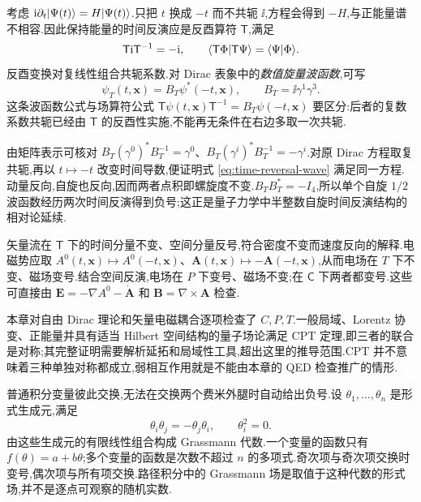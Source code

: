 考虑 $\mathrm i\partial_t\lvert \Psi(t)\rangle=H\lvert \Psi(t)\rangle$.只把 $t$ 换成 $-t$ 而不共轭 $\ii$,方程会得到 $-H$,与正能量谱不相容.因此保持能量的时间反演应是反酉算符 $\mathsf T$,满足
\begin{equation}
 \mathsf T\mathrm i\mathsf T^{-1}=-\mathrm i,
 \qquad\langle \mathsf T\Phi\vert \mathsf T\Psi\rangle=\langle \Psi\vert \Phi\rangle.
\end{equation}
反酉变换对复线性组合共轭系数.对 Dirac 表象中的\emph{数值旋量波函数},可写
\begin{equation}
 \psi_T(t,\mathbf x)=B_T\psi^*(-t,\mathbf x),
 \qquad B_T=\ii\gamma^1\gamma^3.
 \label{eq:time-reversal-wave}
\end{equation}
这条波函数公式与场算符公式 $\mathsf T\psi(t,\mathbf x)\mathsf T^{-1}=B_T\psi(-t,\mathbf x)$ 要区分:后者的复数系数共轭已经由 $\mathsf T$ 的反酉性实施,不能再无条件在右边多取一次共轭.

由矩阵表示可核对 $B_T(\gamma^0)^*B_T^{-1}=\gamma^0$、$B_T(\gamma^i)^*B_T^{-1}=-\gamma^i$.对原 Dirac 方程取复共轭,再以 $t\mapsto-t$ 改变时间导数,便证明式 \eqref{eq:time-reversal-wave} 满足同一方程.动量反向,自旋也反向,因而两者点积即螺旋度不变.$B_TB_T^*=-I_4$,所以单个自旋 $1/2$ 波函数经历两次时间反演得到负号;这正是量子力学中半整数自旋时间反演结构的相对论延续.

矢量流在 $\mathsf T$ 下的时间分量不变、空间分量反号,符合密度不变而速度反向的解释.电磁势应取 $A^0(t,\mathbf x)\mapsto A^0(-t,\mathbf x)$、$\mathbf A(t,\mathbf x)\mapsto-\mathbf A(-t,\mathbf x)$,从而电场在 $T$ 下不变、磁场变号.结合空间反演,电场在 $P$ 下变号、磁场不变;在 $\mathsf C$ 下两者都变号.这些可直接由 $\mathbf E=-\nabla A^0-\dot{\mathbf A}$ 和 $\mathbf B=\nabla\times\mathbf A$ 检查.

\begin{remark}
本章对自由 Dirac 理论和矢量电磁耦合逐项检查了 $C,P,T$.一般局域、Lorentz 协变、正能量并具有适当 Hilbert 空间结构的量子场论满足 CPT 定理,即三者的联合是对称;其完整证明需要解析延拓和局域性工具,超出这里的推导范围.CPT 并不意味着三种单独对称都成立,弱相互作用就是不能由本章的 QED 检查推广的情形.
\end{remark}


普通积分变量彼此交换,无法在交换两个费米外腿时自动给出负号.设 $\theta_1,\ldots,\theta_n$ 是形式生成元,满足
\begin{equation}
 \theta_i\theta_j=-\theta_j\theta_i,
 \qquad \theta_i^2=0.
\end{equation}
由这些生成元的有限线性组合构成 Grassmann 代数.一个变量的函数只有 $f(\theta)=a+b\theta$;多个变量的函数是次数不超过 $n$ 的多项式.奇次项与奇次项交换时变号,偶次项与所有项交换.路径积分中的 Grassmann 场是取值于这种代数的形式场,并不是逐点可观察的随机实数.

